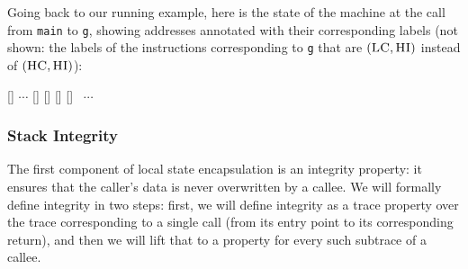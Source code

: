 \documentclass[acmsmall,review,anonymous]{acmart}\settopmatter{printfolios=true,printccs=false,printacmref=false}
\begin{document}
Going back to our running example, here is the state of the machine at
the call from {\tt main} to {\tt g}, showing addresses annotated with their
corresponding labels (not shown: the labels of the instructions
corresponding to {\tt g} that are $(\textsc{LC}, \textsc{HI})$ instead of
$(\HIGHSEC, \HIGHINT)$):
\vspace*{0.2em}
\begin{center}
\MemoryLabel{43.5em}{2em}{\SP}
[{\makebox[0pt]{$(\HIGHSEC,\HIGHINT)$}}]%
\hspace*{3pt}
$\cdots$
[{\makebox[0pt]{$(\HIGHSEC, \LOWINT)$}}]%
[{\makebox[0pt]{$(\HIGHSEC, \HIGHINT)$}}]%
[{\makebox[0pt]{$(\LOWSEC, \LOWINT)$}}]%
[{\makebox[0pt]{$(\HIGHSEC, \LOWINT)$}}]
~$\cdots$
\\
\end{center}



\subsubsection{Stack Integrity}

The first component of local state encapsulation is an integrity
property: it ensures that the caller's data is never overwritten by a
callee. We will formally define integrity in two steps: first, we will
define integrity as a trace property over the trace corresponding to a
single call (from its entry point to its corresponding return), and
then we will lift that to a property for every such subtrace of a
callee.
\end{document}
